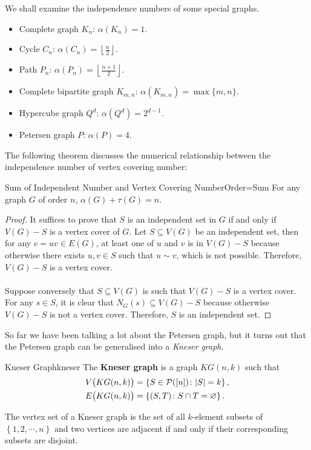 \documentclass[math]{amznotes}
\theoremstyle{remark}
\begin{document}
We shall examine the independence numbers of some special graphs.
\begin{itemize}
    \item Complete graph $K_n$: $\alpha(K_n) = 1$.
    \item Cycle $C_n$: $\alpha(C_n) = \left\lfloor\frac{n}{2}\right\rfloor$.
    \item Path $P_n$: $\alpha(P_n) = \left\lfloor\frac{n + 1}{2}\right\rfloor$.
    \item Complete bipartite graph $K_{m, n}$: $\alpha(K_{m, n}) = \max\{m, n\}$.
    \item Hypercube graph $Q^d$: $\alpha(Q^d) = 2^{d - 1}$.
    \item Petersen graph $P$: $\alpha(P) = 4$.
\end{itemize}
The following theorem discusses the numerical relationship between the independence number of vertex covering number:
\begin{probox}{Sum of Independent Number and Vertex Covering Number}{Order=Sum}
    For any graph $G$ of order $n$, $\alpha(G) + \tau(G) = n$.
    \tcblower
    \begin{proof}
        It suffices to prove that $S$ is an independent set in $G$ if and only if $V(G) - S$ is a vertex cover of $G$. Let $S \subseteq V(G)$ be an independent set, then for any $e = uv \in E(G)$, at least one of $u$ and $v$ is in $V(G) - S$ because otherwise there exists $u, v \in S$ such that $u \sim v$, which is not possible. Therefore, $V(G) - S$ is a vertex cover.
        \\\\
        Suppose conversely that $S \subseteq V(G)$ is such that $V(G) - S$ is a vertex cover. For any $s \in S$, it is clear that $N_G\left(s\right) \subseteq V\left(G\right) - S$ because otherwise $V\left(G\right) - S$ is not a vertex cover. Therefore, $S$ is an independent set.
    \end{proof}
\end{probox}
So far we have been talking a lot about the Petersen graph, but it turns out that the Petersen graph can be generalised into a \textit{Kneser graph}.
\begin{dfnbox}{Kneser Graph}{kneser}
    The {\color{red} \textbf{Kneser graph}} is a graph $KG(n, k)$ such that 
    \begin{align*}
        V\bigl(KG(n, k)\bigr) & = \left\{S \in \mathcal{P}([n]) \colon {\left\lvert {S} \right\rvert} = k\right\}, \\
        E\bigl(KG(n, k)\bigr) & = \left\{(S, T) \colon S \cap T = \varnothing\right\}.
    \end{align*}
\end{dfnbox}
The vertex set of a Kneser graph is the set of all $k$-element subsets of $\left\{1, 2, \cdots, n\right\}$ and two vertices are adjacent if and only if their corresponding subsets are disjoint.
\end{document}
